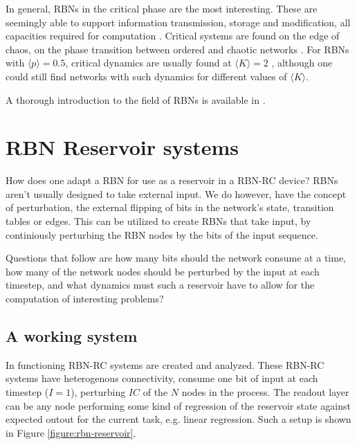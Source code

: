 In general, RBNs in the critical phase are the most interesting.
These are seemingly able to support information transmission, storage and modification,
all capacities required for computation \cite{langton3computation}.
Critical systems are found on the edge of chaos,
on the phase transition between ordered and chaotic networks \cite{gershenson2004introduction}.
For RBNs with $\langle p \rangle = 0.5$,
critical dynamics are usually found at $\langle K \rangle = 2$ \cite{gershenson2004introduction},
although one could still find networks with such dynamics for different values of $\langle K \rangle$.

A thorough introduction to the field of RBNs is available in \cite{gershenson2004introduction}.

\section{RBN Reservoir systems}
\label{subsection:rbn-reservoir-systems}

How does one adapt a RBN for use as a reservoir in a RBN-RC device?
RBNs aren't usually designed to take external input.
We do however, have the concept of perturbation,
the external flipping of bits in the network's state,
transition tables or edges.
This can be utilized to create RBNs that take input,
by continiously perturbing the RBN nodes by the bits of the input sequence.

Questions that follow are how many bits should the network consume at a time,
how many of the network nodes should be perturbed by the input at each timestep,
and what dynamics must such a reservoir have to allow for the computation of interesting problems?

\subsection{A working system}

In \cite{rbn-reservoir} functioning RBN-RC systems are created and analyzed.
These RBN-RC systems have heterogenous connectivity,
consume one bit of input at each timestep ($I=1$),
perturbing $IC$ of the $N$ nodes in the process.
The readout layer can be any node performing some kind of regression of the reservoir state against expected outout for the current task, e.g. linear regression.
Such a setup is shown in Figure \ref{figure:rbn-reservoir}.

